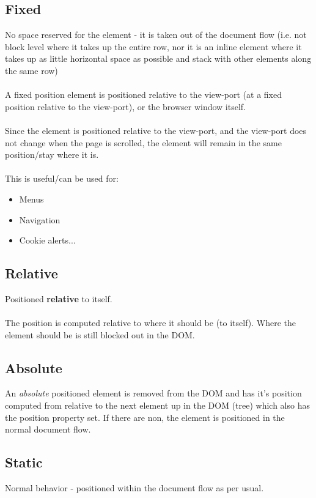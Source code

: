 \documentclass[]{article}
\newcommand{\<}{\guilsinglleft}
\renewcommand{\>}{\guilsinglright}
\renewcommand{\it}[1]{\textit{#1}}
\renewcommand{\bf}[1]{\textbf{#1}}
\begin{document}
\subsection{Fixed}
No space reserved for the element - it is taken out of the  document flow (i.e. not block level where it takes up the entire row, nor it is an inline element where it takes up as little horizontal space as possible and stack with other elements along the same row)
\\\\
A fixed position element is positioned relative to the view-port (at a fixed position relative to the view-port), or the browser window itself. 
\\\\
Since the element is positioned relative to the view-port, and the view-port does not change when the page is scrolled, the element will remain in the same position/stay where it is.
\\\\
This is useful/can be used for:
\begin{itemize}
	\item Menus
	\item Navigation
	\item Cookie alerts...
\end{itemize}

\subsection{Relative}
Positioned \bf{relative} to itself.
\\\\
The position is computed relative to where it should be (to itself).  Where the element should be is still blocked out in the DOM.

\subsection{Absolute}
An \it{absolute} positioned element is removed from the DOM and has it's position computed from relative to the next element up in the DOM (tree) which also has the position property set.  If there are non, the element is positioned in the normal document flow.

\subsection{Static}
Normal behavior - positioned within the document flow as per usual.
\end{document}
